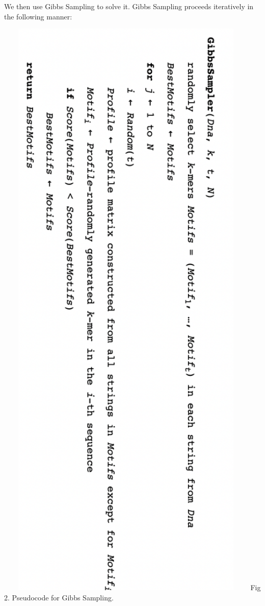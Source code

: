 \documentclass[12pt]{scrartcl} %
\begin{document}
We then use Gibbs Sampling to solve it. Gibbs Sampling proceeds iteratively in the following manner:
\begin{center}
    \includegraphics[width=0.95\textwidth]{Pseudocode.png}
    \newline Fig 2. Pseudocode for Gibbs Sampling.
\end{center}
\end{document}
